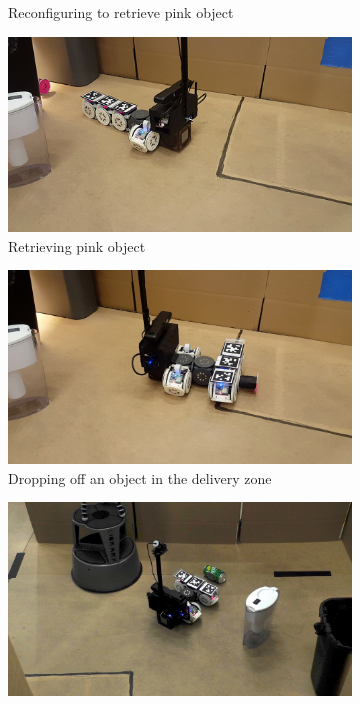 \documentclass[conference]{IEEEtran}
\begin{document}
\begin{figure}[t]
\begin{subfigure}[t]{0.32\textwidth}
        \caption{Reconfiguring to retrieve pink object}
    \end{subfigure}
    \begin{subfigure}[t]{0.32\textwidth}
        \includegraphics[width=\textwidth]{images/pink_retrieval.png}
        \caption{Retrieving pink object}
        \label{fig:pink_grab}
    \end{subfigure}
    \begin{subfigure}[t]{0.32\textwidth}
        \includegraphics[width=\textwidth]{images/dropoff.jpg}
        \caption{Dropping off an object in the delivery zone}
        \label{fig:dropoff}
    \end{subfigure}
    \begin{subfigure}[t]{0.32\textwidth}
        \includegraphics[width=\textwidth]{images/green_retrieval.jpg}

\end{subfigure}
\end{figure}
\end{document}
